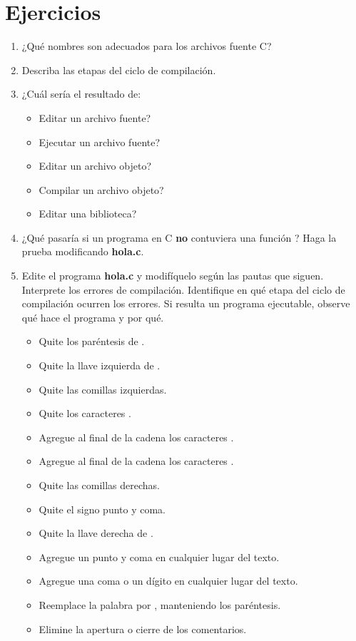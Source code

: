 \section{Ejercicios}
\begin{enumerate}
	\item ¿Qué nombres son adecuados para los archivos fuente C? 
	\item Describa las etapas del ciclo de compilación.
	\item ¿Cuál sería el resultado de: 
		\begin{itemize}
		\item Editar un archivo fuente? 
		\item Ejecutar un archivo fuente? 
		\item Editar un archivo objeto? 
		\item Compilar un archivo objeto? 
		\item Editar una biblioteca?
		\end{itemize}
	\item ¿Qué pasaría si un programa en C \textbf{no} contuviera una función ? Haga la prueba modificando \textbf{hola.c}.
	\item Edite el programa \textbf{hola.c} y modifíquelo según las pautas que siguen. Interprete los errores de compilación. Identifique en qué etapa del ciclo de compilación ocurren los errores. Si resulta un programa ejecutable, observe qué hace el programa y por qué. 
		\begin{itemize}
		\item Quite los paréntesis de . 
		\item Quite la llave izquierda de .
		\item Quite las comillas izquierdas.
		\item Quite los caracteres \quotes{\code{\\n}}.
		\item Agregue al final de la cadena los caracteres \quotes{\code{\\n\\n\\n\\n}}.
		\item Agregue al final de la cadena los caracteres .
		\item Quite las comillas derechas.
		\item Quite el signo punto y coma. 
		\item Quite la llave derecha de .
		\item Agregue un punto y coma en cualquier lugar del texto.
		\item Agregue una coma o un dígito en cualquier lugar del texto. 
		\item Reemplace la palabra  por , manteniendo los paréntesis. 
		\item Elimine la apertura o cierre de los comentarios.
		\end{itemize}
\end{enumerate}


